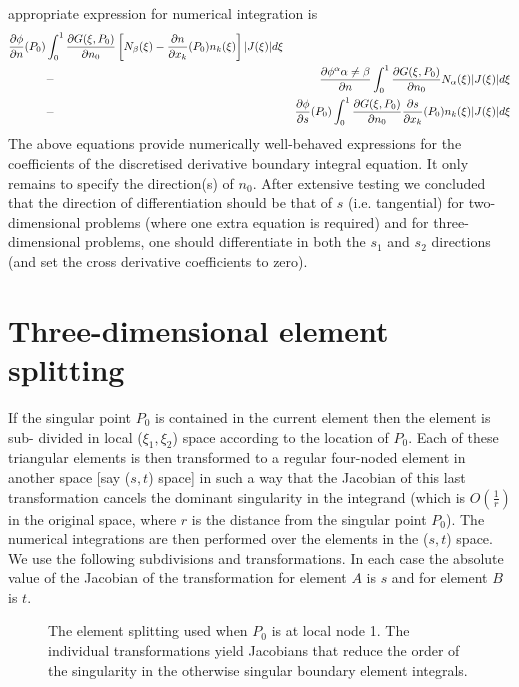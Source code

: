 appropriate expression for numerical integration is
\begin{eqnarray}
  \dfrac{\partial \phi}{\partial n} (P_{0}) &\int_{0}^{1}\frac{\partial G(\xi,P_{0})}
  {\partial n_{0}}\left[ N_{\beta}(\xi)- \dfrac{\partial n}{\partial x_{k}} (P_{0})n_{k}(\xi)\right]
  |J(\xi)|d\xi \nonumber\\
 &-& \dfrac{\partial \phi^\alpha{\alpha\neq\beta}}{\partial n} \int_{0}^{1}
  \frac{\partial G(\xi,P_{0})}{\partial n_{0}}N_{\alpha}(\xi)|J(\xi)|d\xi\nonumber\\
 &-& \dfrac{\partial \phi}{\partial s} (P_{0})\int_{0}^{1}\frac{\partial G(\xi,P_{0})}
  {\partial n_{0}} \dfrac{\partial s}{\partial x_{k}} (P_{0})n_{k}(\xi)|J(\xi)|d\xi
 \label{eq:approp}
\end{eqnarray}
The above equations provide numerically well-behaved expressions for the
coefficients of the discretised derivative boundary integral equation.  It
only remains to specify the direction(s) of $n_{0}$.  After extensive testing
\cite{tomlinson:1996} we concluded that the direction of differentiation
should be that of $s$ (i.e.  tangential) for two-dimensional problems (where
one extra equation is required) and for three-dimensional problems, one should
differentiate in both the $s_{1}$ and $s_{2}$ directions (and set the cross
derivative coefficients to zero).

\section{Three-dimensional element splitting}

If the singular point $P_{0}$ is contained in the current element then the
element is sub- divided in local ($\xi_{1}, \xi_{2}$) space according to the
location of $P_{0}$.  Each of these triangular elements is then transformed to
a regular four-noded element in another space [say ($s, t$) space] in such a
way that the Jacobian of this last transformation cancels the dominant
singularity in the integrand (which is $O( \frac{1}{r} )$ in the original
space, where $r$ is the distance from the singular point $P_{0}$).  The
numerical integrations are then performed over the elements in the ($s,t$)
space.  We use the following subdivisions and transformations.  In each case
the absolute value of the Jacobian of the transformation for element $A$ is
$s$ and for element $B$ is $t$.

\begin{figure}
\centering
 \caption[The element splitting used when $P_{0}$ is at local node 1]{The element splitting used when $P_{0}$ is at local node 1.  The individual transformations 
   yield Jacobians that reduce the order of the singularity in the otherwise
   singular boundary element integrals.}
\label{fig:A1}
\end{figure}

